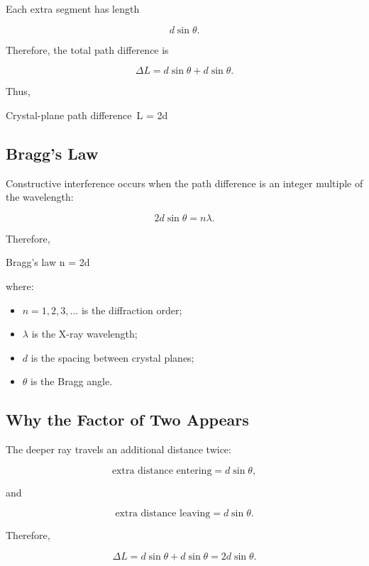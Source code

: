 \documentclass{studentnotes}
\begin{document}
Each extra segment has length

\[
    d\sin\theta.
\]

Therefore, the total path difference is

\[
    \Delta L
    =
    d\sin\theta+d\sin\theta.
\]

Thus,

\begin{namedformula}{Crystal-plane path difference}
    \Delta\,L
    =
    2d\sin\theta%
\end{namedformula}

\subsection{Bragg's Law}

Constructive interference occurs when the path difference is an integer multiple of the wavelength:

\[
    2d\sin\theta=n\lambda.
\]

Therefore,

\begin{namedformula}{Bragg's law}
    n\lambda%
    =
    2d\sin\theta%
\end{namedformula}

where:

\begin{itemize}
    \item \(n=1,2,3,\ldots\) is the diffraction order;
    \item \(\lambda\) is the X-ray wavelength;
    \item \(d\) is the spacing between crystal planes;
    \item \(\theta\) is the Bragg angle.
\end{itemize}

\subsection{Why the Factor of Two Appears}

The deeper ray travels an additional distance twice:

\[
    \text{extra distance entering}
    =
    d\sin\theta,
\]

and

\[
    \text{extra distance leaving}
    =
    d\sin\theta.
\]

Therefore,

\[
    \Delta L
    =
    d\sin\theta+d\sin\theta
    =
    2d\sin\theta.
\]
\end{document}
